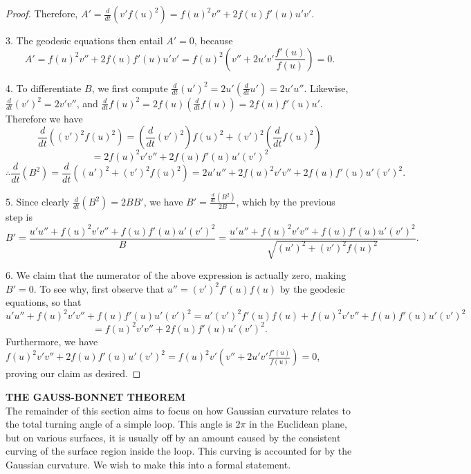 \documentclass[leqno]{book}
\begin{document}
\begin{proof}
Therefore, $A'=\frac{d}{dt}(v'f(u)^2)=f(u)^2v''+2f(u)f'(u)u'v'$.

3. The geodesic equations then entail $A'=0$, because
$$A'=f(u)^2v''+2f(u)f'(u)u'v'=f(u)^2\left(v''+2u'v'\frac{f'(u)}{f(u)}\right)=0.$$

4. To differentiate $B$, we first compute $\frac d{dt}(u')^2=2u'\left(\frac d{dt}u'\right)=2u'u''$.  Likewise, $\frac d{dt}(v')^2=2v'v''$, and $\frac d{dt}f(u)^2=2f(u)\left(\frac d{dt}f(u)\right)=2f(u)f'(u)u'$.  Therefore we have
$$\frac{d}{dt}\left((v')^2f(u)^2\right)=\left(\frac d{dt}(v')^2\right)f(u)^2+(v')^2\left(\frac d{dt}f(u)^2\right)$$
$$=2f(u)^2v'v''+2f(u)f'(u)u'(v')^2$$
$$\therefore\frac d{dt}(B^2)=\frac d{dt}\left((u')^2+(v')^2f(u)^2\right)=2u'u''+2f(u)^2v'v''+2f(u)f'(u)u'(v')^2.$$

5. Since clearly $\frac d{dt}(B^2)=2BB'$, we have $B'=\frac{\frac d{dt}(B^2)}{2B}$, which by the previous step is
$$B'=\frac{u'u''+f(u)^2v'v''+f(u)f'(u)u'(v')^2}{B}=\frac{u'u''+f(u)^2v'v''+f(u)f'(u)u'(v')^2}{\sqrt{(u')^2+(v')^2f(u)^2}}.$$

6. We claim that the numerator of the above expression is actually zero, making $B'=0$.  To see why, first observe that $u''=(v')^2f'(u)f(u)$ by the geodesic equations, so that
$$u'u''+f(u)^2v'v''+f(u)f'(u)u'(v')^2=u'(v')^2f'(u)f(u)+f(u)^2v'v''+f(u)f'(u)u'(v')^2$$
$$=f(u)^2v'v''+2f(u)f'(u)u'(v')^2.$$
Furthermore, we have $f(u)^2v'v''+2f(u)f'(u)u'(v')^2=f(u)^2v'\left(v''+2u'v'\frac{f'(u)}{f(u)}\right)=0$, proving our claim as desired.
\end{proof}

\noindent\textbf{THE GAUSS-BONNET THEOREM}\\

\noindent The remainder of this section aims to focus on how Gaussian curvature relates to the total turning angle of a simple loop.  This angle is $2\pi$ in the Euclidean plane, but on various surfaces, it is usually off by an amount caused by the consistent curving of the surface region inside the loop.  This curving is accounted for by the Gaussian curvature.  We wish to make this into a formal statement.
\end{document}
